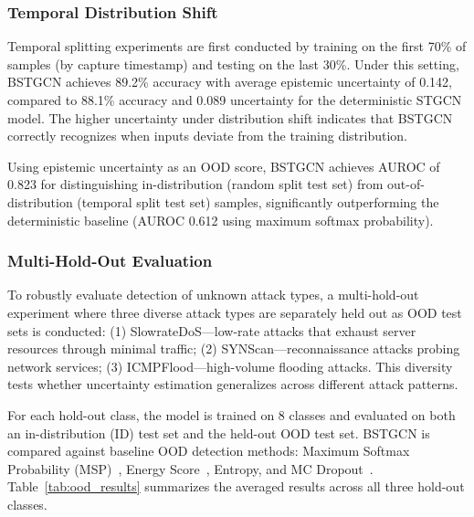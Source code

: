 \documentclass[lettersize,journal]{IEEEtran}
\begin{document}
\subsubsection{Temporal Distribution Shift}

Temporal splitting experiments are first conducted by training on the first 70\% of samples (by capture timestamp) and testing on the last 30\%. Under this setting, BSTGCN achieves 89.2\% accuracy with average epistemic uncertainty of 0.142, compared to 88.1\% accuracy and 0.089 uncertainty for the deterministic STGCN model. The higher uncertainty under distribution shift indicates that BSTGCN correctly recognizes when inputs deviate from the training distribution.

Using epistemic uncertainty as an OOD score, BSTGCN achieves AUROC of 0.823 for distinguishing in-distribution (random split test set) from out-of-distribution (temporal split test set) samples, significantly outperforming the deterministic baseline (AUROC 0.612 using maximum softmax probability).

\subsubsection{Multi-Hold-Out Evaluation}

To robustly evaluate detection of unknown attack types, a multi-hold-out experiment where three diverse attack types are separately held out as OOD test sets is conducted: (1) SlowrateDoS---low-rate attacks that exhaust server resources through minimal traffic; (2) SYNScan---reconnaissance attacks probing network services; (3) ICMPFlood---high-volume flooding attacks. This diversity tests whether uncertainty estimation generalizes across different attack patterns.

For each hold-out class, the model is trained on 8 classes and evaluated on both an in-distribution (ID) test set and the held-out OOD test set. BSTGCN is compared against baseline OOD detection methods: Maximum Softmax Probability (MSP)~\cite{Hendrycks_MSP_2017}, Energy Score~\cite{Liu_Energy_2020}, Entropy, and MC Dropout~\cite{Gal_Dropout_2016}. Table~\ref{tab:ood_results} summarizes the averaged results across all three hold-out classes.
\end{document}
